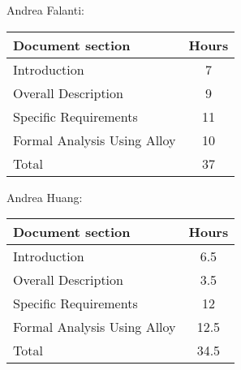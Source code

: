 Andrea Falanti:

\begin{tabular}{|l|c|}
    \hline
    Document section & Hours \\
    \hline
     Introduction & 7\\
     Overall Description & 9\\
     Specific Requirements & 11\\
     Formal Analysis Using Alloy & 10\\
     \hline
     Total & 37\\
     \hline
\end{tabular}
\vskip 0.3in

Andrea Huang:

\begin{tabular}{|l|c|}
    \hline
    Document section & Hours \\
    \hline
     Introduction &  6.5\\
     Overall Description & 3.5\\
     Specific Requirements & 12\\
     Formal Analysis Using Alloy & 12.5\\
     \hline
     Total & 34.5\\
     \hline
\end{tabular}